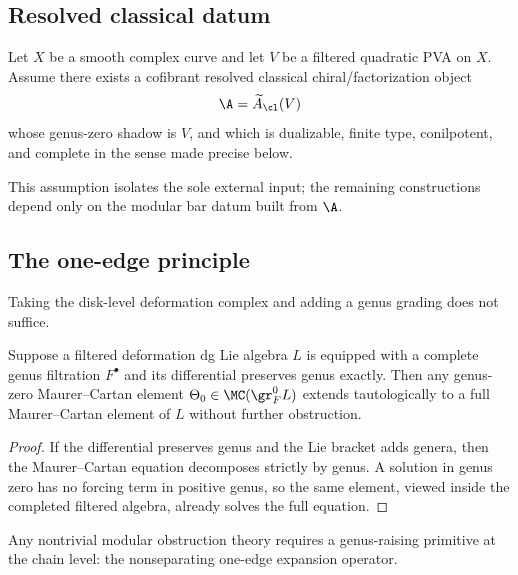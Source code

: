\subsection{Resolved classical datum}

\begin{assumption}
\label{assum:resolved-classical-datum}
Let $X$ be a smooth complex curve and let $V$ be a filtered quadratic PVA on $X$.
Assume there exists a cofibrant resolved classical chiral/factorization object
\[
\A=\widetilde A_{\cl}(V)
\]
whose genus-zero shadow is $V$, and which is dualizable, finite type, conilpotent,
and complete in the sense made precise below.
\end{assumption}

\begin{remark}
This assumption isolates the sole external input; the remaining constructions depend only on the modular bar datum built from $\A$.
\end{remark}

\subsection{The one-edge principle}

Taking the disk-level deformation complex and adding a genus grading does not suffice.

\begin{proposition}
Suppose a filtered deformation dg Lie algebra $L$ is equipped with a complete genus
filtration $F^\bullet$ and its differential preserves genus exactly. Then any genus-zero
Maurer--Cartan element $\Theta_0\in \MC(\gr_F^0 L)$ extends tautologically to a full
Maurer--Cartan element of $L$ without further obstruction.
\end{proposition}

\begin{proof}
If the differential preserves genus and the Lie bracket adds genera, then the Maurer--Cartan
equation decomposes strictly by genus. A solution in genus zero has no forcing term in
positive genus, so the same element, viewed inside the completed filtered algebra, already
solves the full equation.
\end{proof}

\begin{remark}
Any nontrivial modular obstruction theory requires a genus-raising primitive at the chain level: the nonseparating one-edge expansion operator.
\end{remark}

